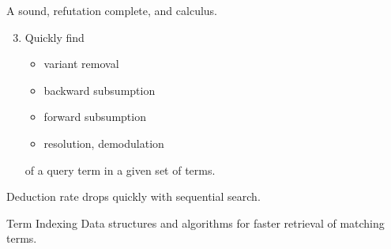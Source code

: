 

\begin{goal}
	A sound, refutation complete, and  calculus.\\[0.5em]
	\begin{enumerate}
		\setcounter{enumi}{2}
		\item Quickly find
\begin{itemize}

\item {} \hfill{\colG\footnotesize variant removal}
%

\item {}   \hfill{\colG\footnotesize backward subsumption}\\

\item {}  \hfill{\colG\footnotesize forward subsumption}\\

\item {} \hfill{\colG\footnotesize resolution, demodulation}\\

\end{itemize}
of a query term in a given set of terms.
\end{enumerate}

\end{goal}


	\begin{observation}
		Deduction rate drops quickly with sequential search.
	\end{observation}
	
	
	
	\begin{block}{Term Indexing}
		Data structures and algorithms for faster retrieval of matching terms.
	\end{block}
